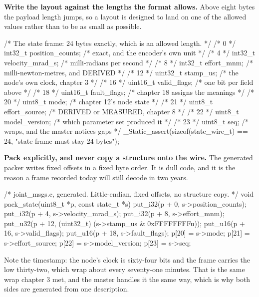 \begin{steps}
\item \textbf{Write the layout against the lengths the format allows.} Above
eight bytes the payload length jumps, so a layout is designed to land on one of
the allowed values rather than to be as small as possible.
\begin{ccode}
/* The state frame: 24 bytes exactly, which is an allowed length. */
/*  0 */ int32_t  position_counts;    /* exact, and the encoder's own unit */
/*  4 */ int32_t  velocity_mrad_s;    /* milli-radians per second          */
/*  8 */ int32_t  effort_mnm;         /* milli-newton-metres, and DERIVED  */
/* 12 */ uint32_t stamp_us;           /* the node's own clock, chapter 3   */
/* 16 */ uint16_t valid_flags;        /* one bit per field above           */
/* 18 */ uint16_t fault_flags;        /* chapter 18 assigns the meanings   */
/* 20 */ uint8_t  mode;               /* chapter 12's node state           */
/* 21 */ uint8_t  effort_source;      /* DERIVED or MEASURED, chapter 8    */
/* 22 */ uint8_t  model_version;      /* which parameter set produced it   */
/* 23 */ uint8_t  seq;                /* wraps, and the master notices gaps */
_Static_assert(sizeof(state_wire_t) == 24, "state frame must stay 24 bytes");
\end{ccode}


\item \textbf{Pack explicitly, and never copy a structure onto the wire.} The
generated packer writes fixed offsets in a fixed byte order. It is dull code,
and it is the reason a frame recorded today will still decode in two years.
\begin{ccode}
/* joint_msgs.c, generated. Little-endian, fixed offsets, no structure copy. */
void pack_state(uint8_t *p, const state_t *s)
{
    put_i32(p +  0, s->position_counts);
    put_i32(p +  4, s->velocity_mrad_s);
    put_i32(p +  8, s->effort_mnm);
    put_u32(p + 12, (uint32_t) (s->stamp_us & 0xFFFFFFFFu));
    put_u16(p + 16, s->valid_flags);
    put_u16(p + 18, s->fault_flags);
    p[20] = s->mode;  p[21] = s->effort_source;
    p[22] = s->model_version;  p[23] = s->seq;
}
\end{ccode}
Note the timestamp: the node's clock is sixty-four bits and the frame carries
the low thirty-two, which wrap about every seventy-one minutes. That is the same
wrap chapter 3 met, and the master handles it the same way, which is why both
sides are generated from one description.


\end{steps}
